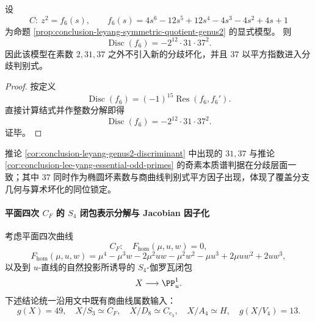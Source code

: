 \begin{corollary}[属 \(2\) 商模型的分歧判别式]\label{cor:conclusion-leyang-genus2-discriminant}
设
\[
C:\ z^2=f_6(s),\qquad
f_6(s)=4s^6-12s^5+12s^4-4s^3-4s^2+4s+1
\]
为命题 \ref{prop:conclusion-leyang-symmetric-quotient-genus2} 的显式模型。
则
\[
\operatorname{Disc}(f_6)=-2^{12}\cdot 31\cdot 37^2.
\]
因此该模型在素数 \(2,31,37\) 之外不引入新的分歧坏化，并且 \(37\) 以平方指数进入分歧判别式。
\end{corollary}
\begin{proof}
按定义
\[
\operatorname{Disc}(f_6)=(-1)^{15}\operatorname{Res}(f_6,f_6').
\]
直接计算结式并作整数分解即得
\[
\operatorname{Disc}(f_6)=-2^{12}\cdot 31\cdot 37^2.
\]
证毕。
\end{proof}

\begin{remark}[与本质素数谱条目的兼容性]\label{rem:conclusion-leyang-self-fiber-compat-essential-spectrum}
推论 \ref{cor:conclusion-leyang-genus2-discriminant} 中出现的 \(31,37\) 与推论 \ref{cor:conclusion-lee-yang-essential-odd-primes} 的奇素本质谱判据在分歧层面一致；其中 \(37\) 同时作为椭圆坏素数与商曲线判别式平方因子出现，体现了覆盖分支几何与算术坏化的同位锁定。
\end{remark}

\paragraph{平面四次 \texorpdfstring{$C_F$}{CF} 的 \texorpdfstring{$S_4$}{S4} 闭包表示分解与 Jacobian 因子化}
考虑平面四次曲线
\[
C_F:\quad F_{\mathrm{hom}}(\mu,u,w)=0,
\]
\[
F_{\mathrm{hom}}(\mu,u,w)
=\mu^4-\mu^3w-2\mu^2uw-\mu^2w^2-\mu u^3+2\mu u w^2+2u w^3,
\]
以及到 \(u\)-直线的自然投影所诱导的 \(S_4\)-伽罗瓦闭包
\[
X\longrightarrow \PP^1_u.
\]
下述结论统一沿用文中既有商曲线属数输入：
\[
g(X)=49,\quad
X/S_3\simeq C_F,\quad
X/D_8\simeq C_{e_3},\quad
X/A_4\simeq H,\quad
g(X/V_4)=13.
\]



